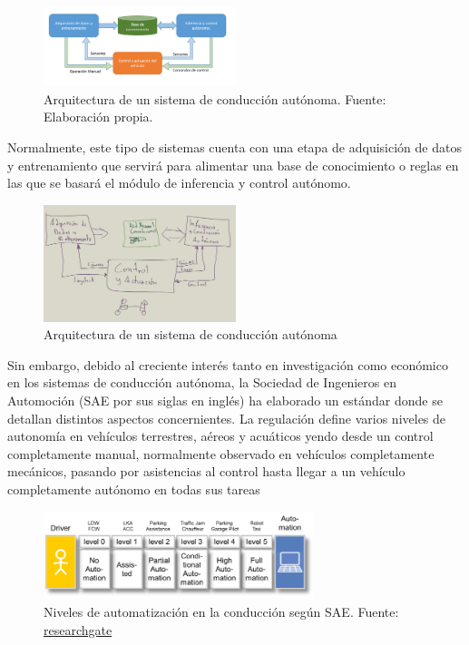 \documentclass[12pt,letterpaper]{article}
\begin{document}
\begin{figure}[!h] 
    \centering
    \includegraphics[width=0.5\textwidth]{img/graficos/esquema}
    \caption{Arquitectura de un sistema de conducción autónoma. Fuente: Elaboración propia.}
    \label{fig:esquema}
    \end{figure}


Normalmente, este tipo de sistemas cuenta con una etapa de adquisición de datos y entrenamiento que servirá para alimentar una base de 
conocimiento o reglas en las que se basará el módulo de inferencia y control autónomo.


\begin{figure}[!h] 
    \centering
    \includegraphics[width=0.5\textwidth]{dibujos/overview}
    \caption{Arquitectura de un sistema de conducción autónoma}
    \label{fig:arquitectura}
    \end{figure}


Sin embargo, debido al creciente interés tanto en investigación como económico en los sistemas de conducción 
autónoma, la Sociedad de Ingenieros en Automoción (SAE por sus siglas en inglés) ha elaborado un estándar donde se 
detallan distintos aspectos concernientes. La regulación define varios niveles de autonomía en 
vehículos terrestres, aéreos y acuáticos yendo desde un control completamente manual, 
normalmente observado en vehículos completamente mecánicos, pasando por asistencias al control 
hasta llegar a un vehículo completamente autónomo en todas sus tareas

\begin{figure}[!h] 
\centering
\includegraphics[width=0.70\textwidth]{levels}
\caption{Niveles de automatización en la conducción según SAE. 
        Fuente: \href{https://www.researchgate.net/figure/Terms-related-to-automated-driving-according-to-SAE-and-VDA_fig1_273883061}{researchgate} }
\label{fig:levels}
\end{figure}
\end{document}
